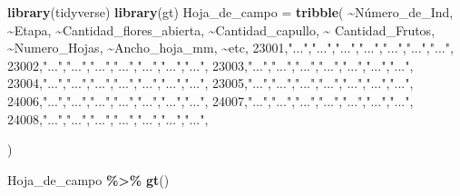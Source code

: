 \documentclass[
]{book}
\newenvironment{Shaded}{\begin{snugshade}}{\end{snugshade}}
\newcommand{\DecValTok}[1]{\textcolor[rgb]{0.00,0.00,0.81}{#1}}
\newcommand{\FunctionTok}[1]{\textcolor[rgb]{0.13,0.29,0.53}{\textbf{#1}}}
\newcommand{\NormalTok}[1]{#1}
\newcommand{\OtherTok}[1]{\textcolor[rgb]{0.56,0.35,0.01}{#1}}
\newcommand{\SpecialCharTok}[1]{\textcolor[rgb]{0.81,0.36,0.00}{\textbf{#1}}}
\newcommand{\StringTok}[1]{\textcolor[rgb]{0.31,0.60,0.02}{#1}}
\theoremstyle{definition}
\theoremstyle{definition}
\theoremstyle{definition}
\theoremstyle{definition}
\theoremstyle{remark}
\begin{document}
\begin{Shaded}
\begin{Highlighting}[]
\FunctionTok{library}\NormalTok{(tidyverse)}
\FunctionTok{library}\NormalTok{(gt)}
\NormalTok{Hoja\_de\_campo }\OtherTok{=} \FunctionTok{tribble}\NormalTok{(}
  \SpecialCharTok{\textasciitilde{}}\NormalTok{Número\_de\_Ind, }\SpecialCharTok{\textasciitilde{}}\NormalTok{Etapa, }\SpecialCharTok{\textasciitilde{}}\NormalTok{Cantidad\_flores\_abierta, }\SpecialCharTok{\textasciitilde{}}\NormalTok{Cantidad\_capullo, }\SpecialCharTok{\textasciitilde{}}\NormalTok{ Cantidad\_Frutos, }\SpecialCharTok{\textasciitilde{}}\NormalTok{Numero\_Hojas, }\SpecialCharTok{\textasciitilde{}}\NormalTok{Ancho\_hoja\_mm, }\SpecialCharTok{\textasciitilde{}}\NormalTok{etc,}
  \DecValTok{23001}\NormalTok{,}\StringTok{"..."}\NormalTok{,}\StringTok{"..."}\NormalTok{,}\StringTok{"..."}\NormalTok{,}\StringTok{"..."}\NormalTok{,}\StringTok{"..."}\NormalTok{,}\StringTok{"..."}\NormalTok{,}\StringTok{"..."}\NormalTok{,}
  \DecValTok{23002}\NormalTok{,}\StringTok{"..."}\NormalTok{,}\StringTok{"..."}\NormalTok{,}\StringTok{"..."}\NormalTok{,}\StringTok{"..."}\NormalTok{,}\StringTok{"..."}\NormalTok{,}\StringTok{"..."}\NormalTok{,}\StringTok{"..."}\NormalTok{,}
  \DecValTok{23003}\NormalTok{,}\StringTok{"..."}\NormalTok{,}\StringTok{"..."}\NormalTok{,}\StringTok{"..."}\NormalTok{,}\StringTok{"..."}\NormalTok{,}\StringTok{"..."}\NormalTok{,}\StringTok{"..."}\NormalTok{,}\StringTok{"..."}\NormalTok{,}
  \DecValTok{23004}\NormalTok{,}\StringTok{"..."}\NormalTok{,}\StringTok{"..."}\NormalTok{,}\StringTok{"..."}\NormalTok{,}\StringTok{"..."}\NormalTok{,}\StringTok{"..."}\NormalTok{,}\StringTok{"..."}\NormalTok{,}\StringTok{"..."}\NormalTok{,}
  \DecValTok{23005}\NormalTok{,}\StringTok{"..."}\NormalTok{,}\StringTok{"..."}\NormalTok{,}\StringTok{"..."}\NormalTok{,}\StringTok{"..."}\NormalTok{,}\StringTok{"..."}\NormalTok{,}\StringTok{"..."}\NormalTok{,}\StringTok{"..."}\NormalTok{,}
  \DecValTok{24006}\NormalTok{,}\StringTok{"..."}\NormalTok{,}\StringTok{"..."}\NormalTok{,}\StringTok{"..."}\NormalTok{,}\StringTok{"..."}\NormalTok{,}\StringTok{"..."}\NormalTok{,}\StringTok{"..."}\NormalTok{,}\StringTok{"..."}\NormalTok{,}
  \DecValTok{24007}\NormalTok{,}\StringTok{"..."}\NormalTok{,}\StringTok{"..."}\NormalTok{,}\StringTok{"..."}\NormalTok{,}\StringTok{"..."}\NormalTok{,}\StringTok{"..."}\NormalTok{,}\StringTok{"..."}\NormalTok{,}\StringTok{"..."}\NormalTok{,}
  \DecValTok{24008}\NormalTok{,}\StringTok{"..."}\NormalTok{,}\StringTok{"..."}\NormalTok{,}\StringTok{"..."}\NormalTok{,}\StringTok{"..."}\NormalTok{,}\StringTok{"..."}\NormalTok{,}\StringTok{"..."}\NormalTok{,}\StringTok{"..."}\NormalTok{,}
  
\NormalTok{)}

\NormalTok{Hoja\_de\_campo }\SpecialCharTok{\%\textgreater{}\%} \FunctionTok{gt}\NormalTok{()}
\end{Highlighting}
\end{Shaded}
\end{document}
